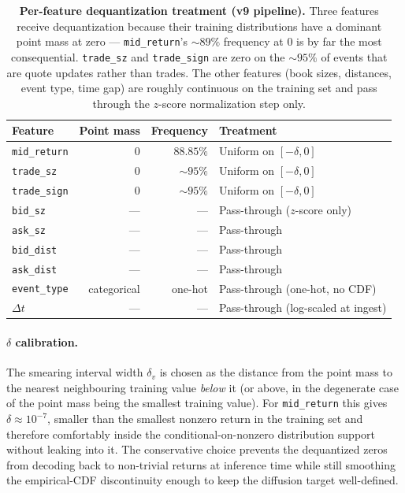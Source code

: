 \documentclass[journal]{IEEEtran}
\theoremstyle{definition}   %
\begin{document}
\begin{table}[ht]
    \centering
    \footnotesize
    \begin{tabular}{lrrl}
        \toprule
        Feature & Point mass & Frequency & Treatment \\
        \midrule
        \texttt{mid\_return}   & $0$ & $88.85\%$ & Uniform on $[-\delta, 0]$ \\
        \texttt{trade\_sz}     & $0$ & $\sim 95\%$ & Uniform on $[-\delta, 0]$ \\
        \texttt{trade\_sign}   & $0$ & $\sim 95\%$ & Uniform on $[-\delta, 0]$ \\
        \midrule
        \texttt{bid\_sz}       & --- & --- & Pass-through ($z$-score only) \\
        \texttt{ask\_sz}       & --- & --- & Pass-through \\
        \texttt{bid\_dist}     & --- & --- & Pass-through \\
        \texttt{ask\_dist}     & --- & --- & Pass-through \\
        \texttt{event\_type}   & categorical & one-hot & Pass-through (one-hot, no CDF) \\
        \texttt{$\Delta t$}    & --- & --- & Pass-through (log-scaled at ingest) \\
        \bottomrule
    \end{tabular}
    \caption{\textbf{Per-feature dequantization treatment (v9
    pipeline).} Three features receive dequantization because their
    training distributions have a dominant point mass at zero ---
    \texttt{mid\_return}'s $\sim 89\%$ frequency at $0$ is by far
    the most consequential. \texttt{trade\_sz} and
    \texttt{trade\_sign} are zero on the $\sim 95\%$ of events that
    are quote updates rather than trades. The other features
    (book sizes, distances, event type, time gap) are roughly
    continuous on the training set and pass through the
    $z$-score normalization step only.}
    \label{tab:dequant_treatment}
\end{table}

\paragraph{$\delta$ calibration.}
The smearing interval width $\delta_v$ is chosen as the distance
from the point mass to the nearest neighbouring training value
\emph{below} it (or above, in the degenerate case of the point
mass being the smallest training value). For \texttt{mid\_return}
this gives $\delta \approx 10^{-7}$, smaller than the smallest
nonzero return in the training set and therefore comfortably
inside the conditional-on-nonzero distribution support without
leaking into it. The conservative choice prevents the dequantized
zeros from decoding back to non-trivial returns at inference time
while still smoothing the empirical-CDF discontinuity enough to
keep the diffusion target well-defined.
\end{document}
